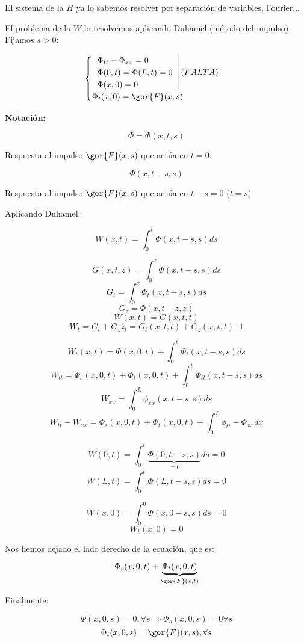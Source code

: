 			El sistema de la $H$ ya lo sabemos resolver por separación de variables, Fourier...

			El problema de la $W$ lo resolvemos aplicando Duhamel (método del impulso). Fijamos $s>0$:

			\[\begin{cases}
				\left.
				\begin{array}{l}
					\Phi_{tt} - \Phi_{xx} = 0 \\
					\Phi(0,t) = \Phi(L,t) = 0 \\
					\Phi(x,0) = 0 \\
				\end{array}
				\right| (FALTA) \\
				\Phi_t(x,0) = \gor{F}(x,s)
			\end{cases}\]


			\textbf{Notación:}


			\[ \Phi = \Phi(x,t,s)\]

			Respuesta al impulso $\gor{F}(x,s)$ que actúa en $t=0$.

			\[ \Phi(x,t-s,s)\]

			Respuesta al impulso $\gor{F} (x,s)$ que actúa en $t-s = 0$ ($t=s$)

			Aplicando Duhamel:

			\[ W(x,t) = \int_0^t \Phi(x,t-s,s) ds \]

			\[ G(x,t,z) = \int_0^z \Phi(x,t-s,s) ds\]
			\[ G_t = \int_0^z \Phi_t (x,t-s,s) ds \]
			\[ G_z = \Phi(x,t-z,z) \]
			\[ W(x,t) = G(x,t,t)\]
			\[ W_t = G_t + G_z z_t = G_t(x,t,t) + G_z (x,t,t) \cdot 1\]

			\[ W_t(x,t) = \Phi(x,0,t)+ \int_0^t \Phi_t (x,t-s,s) ds\]
			\[ W_{tt} = \Phi_{s} (x,0,t) + \Phi_t(x,0,t) + \int_0^t \Phi_{tt} (x,t-s,s) ds  \]
			\[ W_{xx} = \int_0^L \phi_{xx} (x,t-s,s) ds \]
			\[ W_{tt} - W_{xx} = \Phi_{s}(x,0,t) + \Phi_t(x,0,t) + \int_0^L \phi_{tt} - \Phi_{xx} dx \]

			\[ W(0,t) = \int_0^t \underbrace{\Phi(0,t-s,s)}_{\equiv 0} ds = 0  \]
			\[ W(L,t) = \int_0^t \Phi(L,t-s,s) ds = 0 \]

			\[ W(x,0) = \int_0^0 \Phi(x,0-s,s) ds = 0 \]
			\[ W_t (x,0) = 0\]

			Nos hemos dejado el lado derecho de la ecuación, que es:

			\[\Phi_s (x,0,t) + \underbrace{\Phi_t(x,0,t)}_{\gor{F}(x,t)} \]

			Finalmente:

			\[ \Phi(x,0,s) = 0, \forall s \Rightarrow \Phi_s (x,0,s) = 0 \forall s  \]
			\[ \Phi_t(x,0,s) = \gor{F}(x,s), \forall s \]

